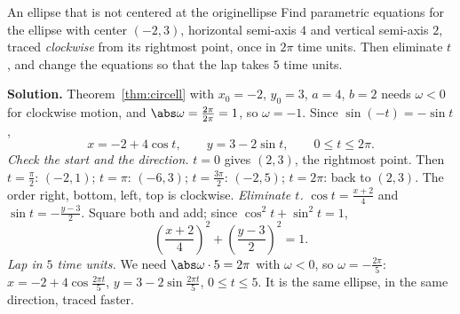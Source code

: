 \documentclass[11pt]{article}
\begin{document}
\begin{center}
\end{center}

\begin{exmp}{An ellipse that is not centered at the origin}{ellipse}
Find parametric equations for the ellipse with center $(-2,3)$, horizontal semi-axis $4$ and vertical semi-axis $2$, traced \emph{clockwise} from its rightmost point, once in $2\pi$ time units. Then eliminate $t$, and change the equations so that the lap takes $5$ time units.

\textbf{Solution.} Theorem~\ref{thm:circell} with $x_0=-2$, $y_0=3$, $a=4$, $b=2$ needs $\omega<0$ for clockwise motion, and $\abs\omega=\frac{2\pi}{2\pi}=1$, so $\omega=-1$. Since $\sin(-t)=-\sin t$,
\[
x=-2+4\cos t,\qquad y=3-2\sin t,\qquad 0\le t\le2\pi.
\]
\emph{Check the start and the direction.} $t=0$ gives $(2,3)$, the rightmost point. Then $t=\frac\pi2$: $(-2,1)$; $t=\pi$: $(-6,3)$; $t=\frac{3\pi}2$: $(-2,5)$; $t=2\pi$: back to $(2,3)$. The order right, bottom, left, top is clockwise.
\emph{Eliminate $t$.} $\cos t=\frac{x+2}4$ and $\sin t=-\frac{y-3}2$. Square both and add; since $\cos^2t+\sin^2t=1$,
\[
\left(\frac{x+2}4\right)^2+\left(\frac{y-3}2\right)^2=1.
\]
\emph{Lap in $5$ time units.} We need $\abs\omega\cdot5=2\pi$ with $\omega<0$, so $\omega=-\frac{2\pi}5$:
$x=-2+4\cos\frac{2\pi t}5$, $y=3-2\sin\frac{2\pi t}5$, $0\le t\le5$. It is the same ellipse, in the same direction, traced faster.
\end{exmp}
\end{document}
